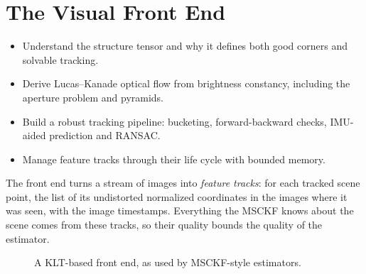 \chapter{The Visual Front End}
\label{ch:frontend}

\begin{objectives}
\begin{itemize}
  \item Understand the structure tensor and why it defines both good corners and solvable tracking.
  \item Derive Lucas--Kanade optical flow from brightness constancy, including the aperture problem and pyramids.
  \item Build a robust tracking pipeline: bucketing, forward-backward checks, IMU-aided prediction and RANSAC.
  \item Manage feature tracks through their life cycle with bounded memory.
\end{itemize}
\end{objectives}

The front end turns a stream of images into \emph{feature tracks}: for each tracked scene point, the list of its
undistorted normalized coordinates in the images where it was seen, with the image timestamps. Everything the MSCKF
knows about the scene comes from these tracks, so their quality bounds the quality of the estimator.

\begin{figure}[h]
\centering
{}
\caption{A KLT-based front end, as used by MSCKF-style estimators.}
\label{fig:frontend-pipeline}
\end{figure}

